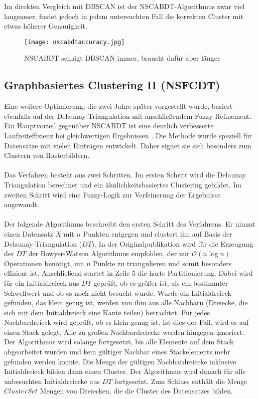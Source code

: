 \documentclass[11pt,ceqn]{book}
\begin{document}
\vspace{\belowdisplayskip}

Im direkten Vergleich mit DBSCAN ist der NSCABDT-Algorithmus zwar viel langsamer, findet jedoch in jedem untersuchten Fall die korrekten Cluster mit etwas höherer Genauigkeit.
\begin{figure}[H]
\centering
\texttt{[image: nscabdtaccuracy.jpg]}
\caption{NSCABDT schlägt DBSCAN immer, braucht dafür aber länger}
\end{figure}



\pagebreak
\hspace{0pt}
\vfill
\subsection{Graphbasiertes Clustering II (NSFCDT)}

Eine weitere Optimierung, die zwei Jahre später vorgestellt wurde, basiert ebenfalls auf der Delaunay-Triangulation mit anschließendem Fuzzy Refinement. Ein Hauptvorteil gegenüber NSCABDT ist eine deutlich verbesserte Laufzeiteffizienz bei gleichwertigen Ergebnissen \cite{nsfcdt}. Die Methode wurde speziell für Datensätze mit vielen Einträgen entwickelt. Daher eignet sie sich besonders zum Clustern von Rasterbildern.\\~\\

Das Verfahren besteht aus zwei Schritten. Im ersten Schritt wird die Delaunay Triangulation berechnet und ein ähnlichkeitsbasiertes Clustering gebildet. Im zweiten Schritt wird eine Fuzzy-Logik zur Verfeinerung der Ergebnisse angewandt.\\~\\

Der folgende Algorithmus beschreibt den ersten Schritt des Verfahrens. Er nimmt einen Datensatz $X$ mit $n$ Punkten entgegen und clustert ihn auf Basis der Delaunay-Triangulation ($DT$). In der Originalpublikation wird für die Erzeugung der $DT$ der Bowyer-Watson Algorithmus empfohlen, der nur $\mathcal{O}(n\log{}n)$ Operationen benötigt, um $n$ Punkte zu triangulieren und somit besonders effizient ist. Anschließend startet in Zeile $5$ die harte Partitionierung. Dabei wird für ein Initialdreieck aus $DT$ geprüft, ob es größer ist, als ein bestimmter Schwellwert und ob es noch nicht besucht wurde. Wurde ein Initialdreieck gefunden, das klein genug ist, werden von ihm aus alle Nachbarn (Dreiecke, die sich mit dem Initialdreieck eine Kante teilen) betrachtet. Für jedes Nachbardreieck wird geprüft, ob es klein genug ist. Ist dies der Fall, wird es auf einen Stack gelegt. Alle zu großen Nachbardreiecke werden hingegen ignoriert. Der Algorithmus wird solange fortgesetzt, bis alle Elemente auf dem Stack abgearbeitet wurden und kein gültiger Nachbar eines Stackelements mehr gefunden werden konnte. Die Menge der gültigen Nachbardreiecke inklusive Initialdreieck bilden dann einen Cluster. Der Algorithmus wird danach für alle unbesuchten Initialdreiecke aus $DT$ fortgesetzt. Zum Schluss enthält die Menge $ClusterSet$ Mengen von Dreiecken, die die Cluster des Datensatzes bilden.
\end{document}

